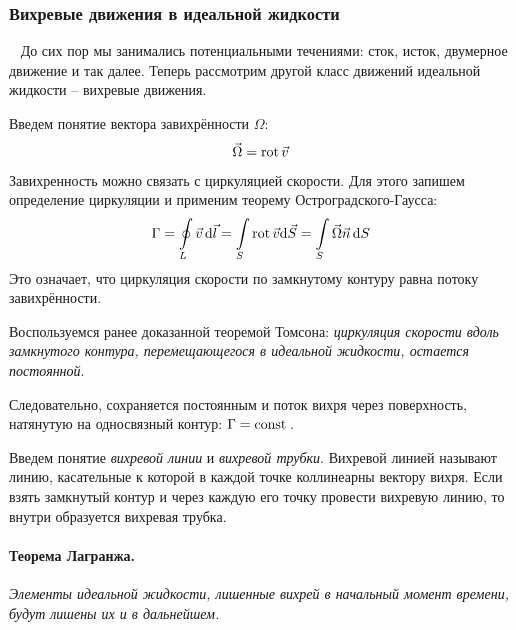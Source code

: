  
\subsubsection{Вихревые движения в идеальной жидкости}\
До сих пор мы занимались потенциальными течениями: сток, исток, двумерное движение и так далее. Теперь рассмотрим другой класс движений идеальной жидкости -- вихревые движения.

Введем понятие вектора завихрённости $\Omega$:
\begin{equation}
	\vec\Omega=\operatorname{rot} \vec{v}
\end{equation}
Завихренность можно связать с циркуляцией скорости. Для этого запишем определение циркуляции и применим теорему Остроградского-Гаусса:
\begin{equation}
	\Gamma=\oint\limits_L \vec{v} \,\dd\vec{l}
	=\int\limits_S \operatorname{rot} \vec{v}\dd \vec{S}=\int\limits_S \vec\Omega\vec{n}\,\dd S 
\end{equation}
Это означает, что циркуляция скорости по замкнутому контуру равна потоку завихрённости.

Воспользуемся ранее доказанной теоремой Томсона: \textit{циркуляция скорости вдоль замкнутого контура,
перемещающегося в идеальной жидкости, остается постоянной}.

Следовательно, сохраняется постоянным и поток вихря через
поверхность, натянутую на односвязный контур: $\Gamma=\mathrm{const}\,$.

Введем понятие \textit{вихревой линии} и \textit{вихревой трубки}.
Вихревой линией называют линию, касательные к которой в каждой
точке коллинеарны вектору вихря.
Если взять замкнутый контур и через каждую его точку провести
вихревую линию, то внутри образуется вихревая трубка.


\paragraph{Теорема Лагранжа. } \textit{Элементы идеальной жидкости, лишенные вихрей в начальный момент
	времени, будут лишены их и в дальнейшем.}


